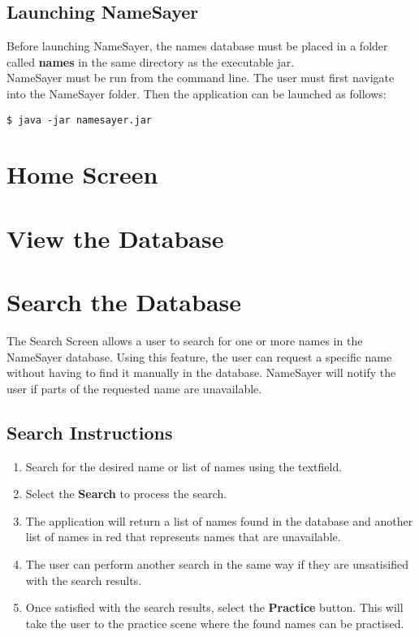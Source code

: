 \documentclass{article}
\begin{document}
\subsection{Launching NameSayer}
Before launching NameSayer, the names database must be placed in a folder called \textbf{names} in the same directory as 
the executable jar. \\

NameSayer must be run from the command line. The user must first navigate into the NameSayer folder. Then the application
can be launched as follows: 

\begin{verbatim}
$ java -jar namesayer.jar
\end{verbatim}

\section{Home Screen}

\section{View the Database}

\section{Search the Database}
The Search Screen allows a user to search for one or more names in the NameSayer database. Using this feature, the user can request a specific name without having to find it manually in the database. NameSayer will notify the user if parts of the requested name are unavailable.

\subsection{Search Instructions}

\begin{enumerate}
	\item Search for the desired name or list of names using the textfield.

	\item Select the \textbf{Search} to process the search.

	\item The application will return a list of names found in the database and another list of names in red that represents names that are unavailable.

	\item The user can perform another search in the same way if they are unsatisified with the search results.

	\item Once satisfied with the search results, select the \textbf{Practice} button. This will take the user to the practice scene
	where the found names can be practised.
\end{enumerate}
\end{document}
